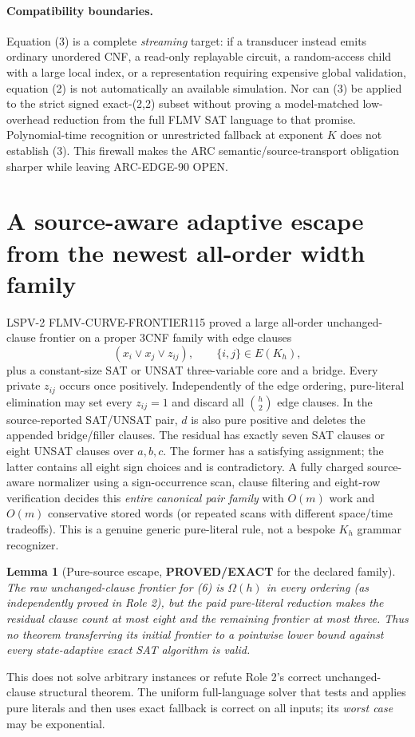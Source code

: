 \documentclass[11pt]{article}
\newtheorem{lemma}{Lemma}
\newcommand{\EXACT}{\textbf{PROVED/EXACT}}
\begin{document}
\paragraph{Compatibility boundaries.}
Equation (3) is a complete \emph{streaming} target: if a transducer instead emits ordinary unordered CNF, a read-only replayable circuit, a random-access child with a large local index, or a representation requiring expensive global validation, equation (2) is not automatically an available simulation. Nor can (3) be applied to the strict signed exact-(2,2) subset without proving a model-matched low-overhead reduction from the full FLMV SAT language to that promise. Polynomial-time recognition or unrestricted fallback at exponent $K$ does not establish (3). This firewall makes the ARC semantic/source-transport obligation sharper while leaving ARC-EDGE-90 OPEN.

\section{A source-aware adaptive escape from the newest all-order width family}
LSPV-2 FLMV-CURVE-FRONTIER115 proved a large all-order unchanged-clause frontier on a proper 3CNF family with edge clauses
\[
 (x_i\vee x_j\vee z_{ij}),\qquad \{i,j\}\in E(K_h),
 \tag{6}
\]
plus a constant-size SAT or UNSAT three-variable core and a bridge. Every private $z_{ij}$ occurs once positively. Independently of the edge ordering, pure-literal elimination may set every $z_{ij}=1$ and discard all $\binom h2$ edge clauses. In the source-reported SAT/UNSAT pair, $d$ is also pure positive and deletes the appended bridge/filler clauses. The residual has exactly seven SAT clauses or eight UNSAT clauses over $a,b,c$. The former has a satisfying assignment; the latter contains all eight sign choices and is contradictory. A fully charged source-aware normalizer using a sign-occurrence scan, clause filtering and eight-row verification decides this \emph{entire canonical pair family} with $O(m)$ work and $O(m)$ conservative stored words (or repeated scans with different space/time tradeoffs). This is a genuine generic pure-literal rule, not a bespoke $K_h$ grammar recognizer.

\begin{lemma}[Pure-source escape, \EXACT{} for the declared family]
The raw unchanged-clause frontier for (6) is $\Omega(h)$ in every ordering (as independently proved in Role 2), but the paid pure-literal reduction makes the residual clause count at most eight and the remaining frontier at most three. Thus \emph{no} theorem transferring its initial frontier to a pointwise lower bound against every state-adaptive exact SAT algorithm is valid.
\end{lemma}
This does not solve arbitrary instances or refute Role 2's correct unchanged-clause structural theorem. The uniform full-language solver that tests and applies pure literals and then uses exact fallback is correct on all inputs; its \emph{worst case} may be exponential.
\end{document}
